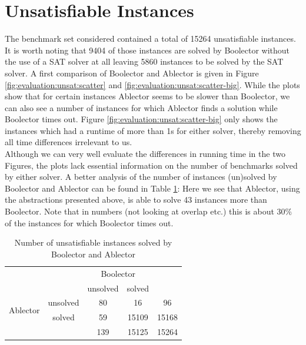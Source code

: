 \section{Unsatisfiable Instances}
The benchmark set considered contained a total of 15264 unsatisfiable instances. It is worth noting that 9404 of those instances are solved by Boolector without the use of a SAT solver at all leaving 5860 instances to be solved by the SAT solver. A first comparison of Boolector and Ablector is given in Figure \ref{fig:evaluation:unsat:scatter} and \ref{fig:evaluation:unsat:scatter-big}. While the plots show that for certain instances Ablector seems to be slower than Boolector, we can also see a number of instances for which Ablector finds a solution while Boolector times out. Figure \ref{fig:evaluation:unsat:scatter-big} only shows the instances which had a runtime of more than 1s for either solver, thereby removing all time differences irrelevant to us.\\
Although we can very well evaluate the differences in running time in the two Figures, the plots lack essential information on the number of benchmarks solved by either solver.
A better analysis of the number of instances (un)solved by Boolector and Ablector can be found in Table \ref{tab:evaluation:unsat:solvedUnsolved}:
Here we see that Ablector, using the abstractions presented above, is able to solve 43 instances more than Boolector. Note that in numbers (not looking at overlap etc.) this is about $30\%$ of the instances for which Boolector times out.

\begin{table}[ht]
    \begin{center}
    \begin{tabular}{cc|c|c|c}
        &&\multicolumn{2}{c|}{Boolector}&\\
        &&unsolved&solved&\\ \hline
        \multirow{2}{*}{Ablector}&unsolved& 80 & 16 & 96 \\ \cline{2-5}
        & solved & 59 & 15109 & 15168 \\ \hline
        & & 139 & 15125 & 15264 \\
    \end{tabular}
    \end{center}
    \caption{Number of unsatisfiable instances solved by Boolector and Ablector}
    \label{tab:evaluation:unsat:solvedUnsolved}
\end{table}

